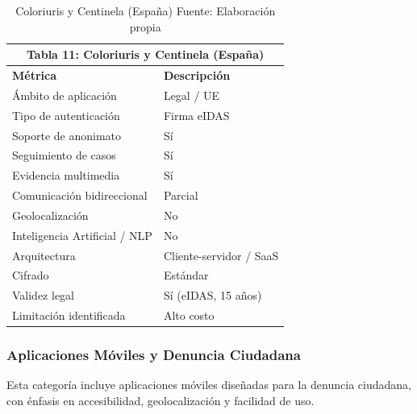 \begin{table}[htbp]
\centering
\small
\begin{tabular}{|l|l|}
\hline \multicolumn{2}{|c|}{\textbf{Tabla 11: Coloriuris y Centinela (España)}} \\
\hline \textbf{Métrica} & \textbf{Descripción} \\
\hline Ámbito de aplicación & Legal / UE \\
\hline Tipo de autenticación & Firma eIDAS \\
\hline Soporte de anonimato & Sí \\
\hline Seguimiento de casos & Sí \\
\hline Evidencia multimedia & Sí \\
\hline Comunicación bidireccional & Parcial \\
\hline Geolocalización & No \\
\hline Inteligencia Artificial / NLP & No \\
\hline Arquitectura & Cliente-servidor / SaaS \\
\hline Cifrado & Estándar \\
\hline Validez legal & Sí (eIDAS, 15 años) \\
\hline Limitación identificada & Alto costo \\
\hline \end{tabular}
\caption{Coloriuris y Centinela (España) \label{tab:coloriuris} \footnotesize Fuente: Elaboración propia \cite{19,20}}
\end{table}



\subsubsection{Aplicaciones Móviles y Denuncia Ciudadana}

\begin{flushleft}
\justifying
Esta categoría incluye aplicaciones móviles diseñadas para la denuncia ciudadana, con énfasis en accesibilidad, geolocalización y facilidad de uso.
\end{flushleft}


